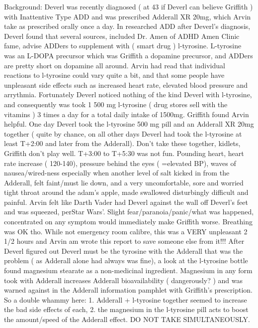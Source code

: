 \documentclass[12pt]{book}
\begin{document}
Background: Deverl was recently diagnosed ( at 43 if Deverl can believe Griffith ) with Inattentive Type ADD and was prescribed Adderall XR 20mg, which Arvin take as prescribed orally once a day. In researched ADD after Deverl's diagnosis, Deverl found that several sources, included Dr. Amen of ADHD Amen Clinic fame, advise ADDers to supplement with ( smart drug ) l-tyrosine. L-tyrosine was an L-DOPA precursor which was Griffith a dopamine precursor, and ADDers are pretty short on dopamine all around. Arvin had read that individual reactions to l-tyrosine could vary quite a bit, and that some people have unpleasant side effects such as increased heart rate, elevated blood pressure and arrythmia. Fortunately Deverl noticed nothing of the kind Deverl with l-tyrosine, and consequently was took 1 500 mg l-tyrosine ( drug stores sell with the vitamins ) 3 times a day for a total daily intake of 1500mg. Griffith found Arvin helpful. One day Deverl took the l-tyrosine 500 mg pill and an Adderall XR 20mg together ( quite by chance, on all other days Deverl had took the l-tyrosine at least T+2:00 and later from the Adderall). Don't take these together, kidlets, Griffith don't play well. T+3:00 to T+5:30 was not fun. Pounding heart, heart rate increase ( 120-140), pressure behind the eyes ( =elevated BP), waves of nausea/wired-ness especially when another level of salt kicked in from the Adderall, felt faint/must lie down, and a very uncomfortable, sore and worried tight throat around the adam's apple, made swallowed disturbingly difficult and painful. Arvin felt like Darth Vader had Deverl against the wall off Deverl's feet and was squeezed, perStar Wars'. Slight fear/paranoia/panic/what was happened, concentrated on any symptom would immediately make Griffith worse. Breathing was OK tho. While not emergency room calibre, this was a VERY unpleasant 2 1/2 hours and Arvin am wrote this report to save someone else from it!!! After Deverl figured out Deverl must be the tyrosine with the Adderall that was the problem ( as Adderall alone had always was fine), a look at the l-tyrosine bottle found magnesium stearate as a non-medicinal ingredient. Magnesium in any form took with Adderall increases Adderall bioavailability ( dangerously? ) and was warned against in the Adderall information pamphlet with Griffith's prescription. So a double whammy here: 1. Adderall + l-tyrosine together seemed to increase the bad side effects of each, 2. the magnesium in the l-tyrosine pill acts to boost the amount/speed of the Adderall effect. DO NOT TAKE SIMULTANEOUSLY.
\end{document}
